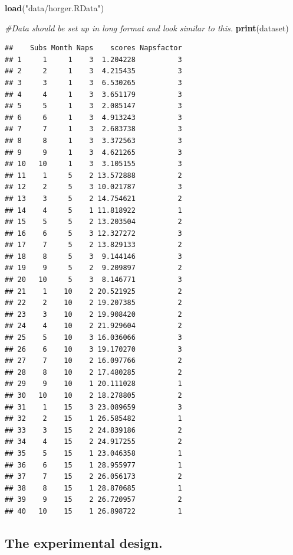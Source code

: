 \documentclass[]{book}
\newenvironment{Shaded}{\begin{snugshade}}{\end{snugshade}}
\newcommand{\CommentTok}[1]{\textcolor[rgb]{0.56,0.35,0.01}{\textit{#1}}}
\newcommand{\KeywordTok}[1]{\textcolor[rgb]{0.13,0.29,0.53}{\textbf{#1}}}
\newcommand{\NormalTok}[1]{#1}
\newcommand{\StringTok}[1]{\textcolor[rgb]{0.31,0.60,0.02}{#1}}
\begin{document}
\begin{Shaded}
\begin{Highlighting}[]
\KeywordTok{load}\NormalTok{(}\StringTok{"data/horger.RData"}\NormalTok{)}

\CommentTok{#Data should be set up in long format and look similar to this. }
\KeywordTok{print}\NormalTok{(dataset)}
\end{Highlighting}
\end{Shaded}

\begin{verbatim}
##    Subs Month Naps    scores Napsfactor
## 1     1     1    3  1.204228          3
## 2     2     1    3  4.215435          3
## 3     3     1    3  6.530265          3
## 4     4     1    3  3.651179          3
## 5     5     1    3  2.085147          3
## 6     6     1    3  4.913243          3
## 7     7     1    3  2.683738          3
## 8     8     1    3  3.372563          3
## 9     9     1    3  4.621265          3
## 10   10     1    3  3.105155          3
## 11    1     5    2 13.572888          2
## 12    2     5    3 10.021787          3
## 13    3     5    2 14.754621          2
## 14    4     5    1 11.818922          1
## 15    5     5    2 13.203504          2
## 16    6     5    3 12.327272          3
## 17    7     5    2 13.829133          2
## 18    8     5    3  9.144146          3
## 19    9     5    2  9.209897          2
## 20   10     5    3  8.146771          3
## 21    1    10    2 20.521925          2
## 22    2    10    2 19.207385          2
## 23    3    10    2 19.908420          2
## 24    4    10    2 21.929604          2
## 25    5    10    3 16.036066          3
## 26    6    10    3 19.170270          3
## 27    7    10    2 16.097766          2
## 28    8    10    2 17.480285          2
## 29    9    10    1 20.111028          1
## 30   10    10    2 18.278805          2
## 31    1    15    3 23.089659          3
## 32    2    15    1 26.585482          1
## 33    3    15    2 24.839186          2
## 34    4    15    2 24.917255          2
## 35    5    15    1 23.046358          1
## 36    6    15    1 28.955977          1
## 37    7    15    2 26.056173          2
## 38    8    15    1 28.870685          1
## 39    9    15    2 26.720957          2
## 40   10    15    1 26.898722          1
\end{verbatim}

\hypertarget{the-experimental-design.}{%
\subsection{The experimental design.}\label{the-experimental-design.}}
\end{document}
